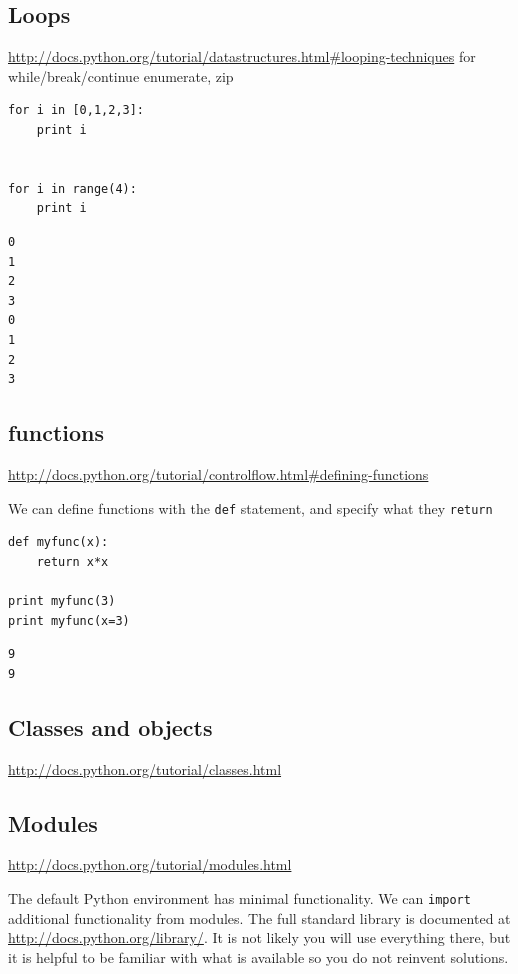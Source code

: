 \documentclass[11pt]{article}
\begin{document}
\subsection{Loops}
\label{sec-3-5}
\url{http://docs.python.org/tutorial/datastructures.html#looping-techniques}
for
while/break/continue
enumerate, zip

\begin{verbatim}
for i in [0,1,2,3]:
    print i


for i in range(4):
    print i
\end{verbatim}

\begin{verbatim}
0
1
2
3
0
1
2
3
\end{verbatim}


\subsection{functions}
\label{sec-3-6}
\url{http://docs.python.org/tutorial/controlflow.html#defining-functions}

We can define functions with the \texttt{def} statement, and specify what they \texttt{return}
\begin{verbatim}
def myfunc(x):
    return x*x

print myfunc(3)
print myfunc(x=3)
\end{verbatim}

\begin{verbatim}
9
9
\end{verbatim}


\subsection{Classes and objects}
\label{sec-3-7}
\url{http://docs.python.org/tutorial/classes.html}


\subsection{Modules}
\label{sec-3-8}
\url{http://docs.python.org/tutorial/modules.html}

The default Python environment has minimal functionality. We can \texttt{import} additional functionality from modules. The full standard library is documented at \url{http://docs.python.org/library/}. It is not likely you will use everything there, but it is helpful to be familiar with what is available so you do not reinvent solutions.
\end{document}
